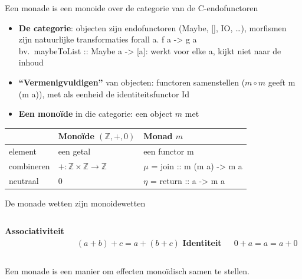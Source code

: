 \documentclass[aspectratio=169,11pt]{beamer}
\newcommand{\code}[1]{{\ttfamily\color{kuldonker}#1}}
\begin{document}
\begin{frame}{Een monade is een monoide over de categorie van de C-endofunctoren}
\begin{itemize}
    \item \textbf{De categorie}: objecten zijn \alert{endofunctoren} (\code{Maybe}, \code{[]}, \code{IO}, \dots),
      morfismen zijn \alert{natuurlijke transformaties} \code{forall a. f a -> g a}\\
      {\small bv.\ \code{maybeToList :: Maybe a -> [a]}: werkt voor elke \code{a}, kijkt niet naar de inhoud}
    \pause
    \item \textbf{``Vermenigvuldigen''} van objecten: functoren \alert{samenstellen}
      ($m \circ m$ geeft \code{m (m a)}), met als eenheid de identiteitsfunctor $\mathrm{Id}$
    \pause
    \item \textbf{Een monoïde} in die categorie: een object $m$ met
  \end{itemize}
  \pause
  \centering
  \begin{tabular}{lll}
    \toprule
    & \textbf{Monoïde} $(\mathbb{Z}, +, 0)$ & \textbf{Monad} $m$ \\
    \midrule
    element      & een getal & een functor \code{m} \\
    combineren   & $+ : \mathbb{Z} \times \mathbb{Z} \to \mathbb{Z}$ & $\mu$ = \code{join :: m (m a) -> m a} \\
    neutraal     & $0$ & $\eta$ = \code{return :: a -> m a} \\
    \bottomrule
  \end{tabular}
\end{frame}

\begin{frame}[fragile]{De monade wetten zijn monoidewetten}
\begin{columns}[c]
    \centering
    \textbf{Associativiteit}\\[4pt]
    \\[4pt]
    {\small $(a + b) + c = a + (b + c)$}
    \centering
    \textbf{Identiteit}\\[4pt]
    \\[4pt]
    {\small $0 + a = a = a + 0$}
  \end{columns}
  Een monade is een manier om effecten monoïdisch samen te stellen.
\end{frame}
\end{document}
